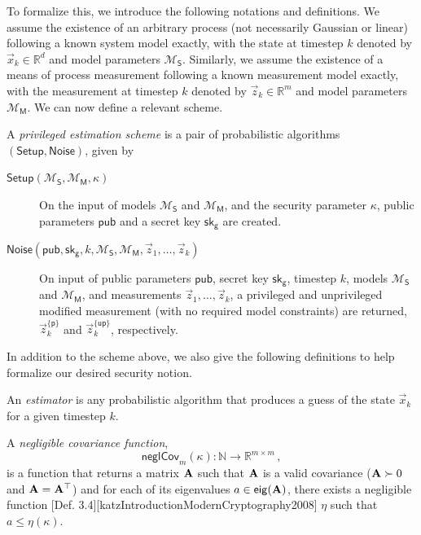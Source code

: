 To formalize this, we introduce the following notations and definitions. We assume the existence of an arbitrary process (not necessarily Gaussian or linear) following a known system model exactly, with the state at timestep $k$ denoted by $\vec{x}_k\in\mathbb{R}^d$ and model parameters $\mathcal{M}_{\mathsf{S}}$. Similarly, we assume the existence of a means of process measurement following a known measurement model exactly, with the measurement at timestep $k$ denoted by $\vec{z}_k\in\mathbb{R}^m$ and model parameters $\mathcal{M}_{\mathsf{M}}$. We can now define a relevant scheme.
\begin{definition}
    A \textit{privileged estimation scheme} is a pair of probabilistic algorithms $(\mathsf{Setup},\mathsf{Noise})$, given by
    \begin{description}
        \item[$\mathsf{Setup}(\mathcal{M}_{\mathsf{S}}, \mathcal{M}_{\mathsf{M}}, \kappa)$] On the input of models $\mathcal{M}_{\mathsf{S}}$ and $\mathcal{M}_{\mathsf{M}}$, and the security parameter $\kappa$, public parameters $\mathsf{pub}$ and a secret key $\mathsf{sk}_{\mathsf{g}}$ are created.
        \item[$\mathsf{Noise}(\mathsf{pub}, \mathsf{sk}_{\mathsf{g}}, k, \mathcal{M}_{\mathsf{S}}, \mathcal{M}_{\mathsf{M}}, \vec{z}_1, \dots, \vec{z}_k)$] On input of public parameters $\mathsf{pub}$, secret key $\mathsf{sk}_{\mathsf{g}}$, timestep $k$, models $\mathcal{M}_{\mathsf{S}}$ and $\mathcal{M}_{\mathsf{M}}$, and measurements $\vec{z}_1,\dots,\vec{z}_k$, a privileged and unprivileged modified measurement (with no required model constraints) are returned, $\vec{z}_k^{\{\mathsf{p}\}}$ and $\vec{z}_k^{\{\mathsf{up}\}}$, respectively.
    \end{description}
\end{definition}
In addition to the scheme above, we also give the following definitions to help formalize our desired security notion.
\begin{definition}\label{def:priv_estimation:crypto_estimator}
    An \textit{estimator} is any probabilistic algorithm that produces a guess of the state $\vec{x}_k$ for a given timestep $k$.
\end{definition}
\begin{definition}\label{def:priv_estimation:negligible_covariance}
    A \textit{negligible covariance function},
    \begin{equation}
        \mathsf{neglCov}_m(\kappa):\mathbb{N}\rightarrow \mathbb{R}^{m\times m}\,,
    \end{equation}
    is a function that returns a matrix ${{\mathbf{A}}}$ such that ${{\mathbf{A}}}$ is a valid covariance (${{\mathbf{A}}}\succ 0$ and ${{\mathbf{A}}}={{\mathbf{A}}}^\top$) and for each of its eigenvalues $a\in\mathsf{eig}({{\mathbf{A}}})$, there exists a negligible function [Def. 3.4][katzIntroductionModernCryptography2008] $\eta$ such that $a\leq\eta(\kappa)$.
\end{definition}

